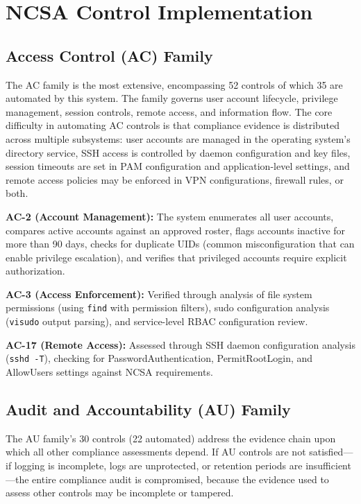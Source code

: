 \documentclass[12pt,oneside]{report}
\begin{document}
\section{NCSA Control Implementation}

\subsection{Access Control (AC) Family}

The AC family is the most extensive, encompassing 52 controls of which 35 are automated by this system. The family governs user account lifecycle, privilege management, session controls, remote access, and information flow. The core difficulty in automating AC controls is that compliance evidence is distributed across multiple subsystems: user accounts are managed in the operating system's directory service, SSH access is controlled by daemon configuration and key files, session timeouts are set in PAM configuration and application-level settings, and remote access policies may be enforced in VPN configurations, firewall rules, or both.

\textbf{AC-2 (Account Management):} The system enumerates all user accounts, compares active accounts against an approved roster, flags accounts inactive for more than 90 days, checks for duplicate UIDs (common misconfiguration that can enable privilege escalation), and verifies that privileged accounts require explicit authorization.

\textbf{AC-3 (Access Enforcement):} Verified through analysis of file system permissions (using \texttt{find} with permission filters), sudo configuration analysis (\texttt{visudo} output parsing), and service-level RBAC configuration review.

\textbf{AC-17 (Remote Access):} Assessed through SSH daemon configuration analysis (\texttt{sshd -T}), checking for PasswordAuthentication, PermitRootLogin, and AllowUsers settings against NCSA requirements.

\subsection{Audit and Accountability (AU) Family}

The AU family's 30 controls (22 automated) address the evidence chain upon which all other compliance assessments depend. If AU controls are not satisfied—if logging is incomplete, logs are unprotected, or retention periods are insufficient—the entire compliance audit is compromised, because the evidence used to assess other controls may be incomplete or tampered.
\end{document}
